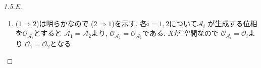 \documentclass[uplatex, dvipdfmx, a4paper, 12pt, class=jsarticle, crop=false]{standalone}
\begin{document}
\begin{proof}[1.5.E]
\begin{enumerate}
		\item (\( 1 \Longrightarrow 2 \))は明らかなので
		(\( 2 \Longrightarrow 1 \))を示す.
		各\( i = 1, 2 \)について\( \mathscr{A}_i \)
		が生成する位相を\( \mathcal{O}_{\mathscr{A}_i} \)とすると
		\( \mathscr{A}_1 = \mathscr{A}_2 \)より,
		\( \mathcal{O}_{\mathscr{A}_1} = \mathcal{O}_{\mathscr{A}_1} \)である.
		\( X \)が  空間なので
		\( \mathcal{O}_{\mathscr{A}_i} = \mathcal{O}_i \)より
		\( \mathcal{O}_1 = \mathcal{O}_2 \)となる.



	\end{enumerate}
\end{proof}
\end{document}

